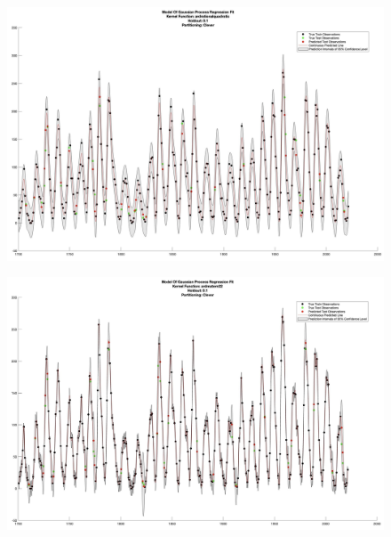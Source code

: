 \documentclass[12pt,a4paper]{article}
\begin{document}
\vspace{3cm}

\begin{figure}[H]
	\centering
	\includegraphics[scale = 0.2]{Ard_Rational_Quadratic.jpg}
\end{figure}

\newpage

\begin{figure}[H]
	\centering
	\includegraphics[scale = 0.2]{Ard_Matern32.jpg}
\end{figure}

\vspace{3cm}
\end{document}
